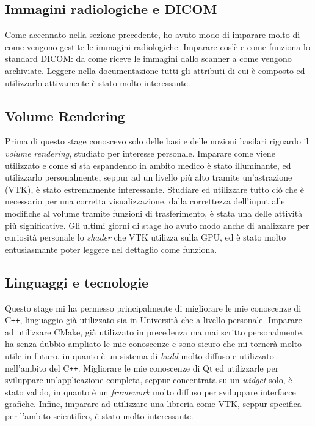\subsection{Immagini radiologiche e DICOM}
Come accennato nella sezione precedente, ho avuto modo di imparare molto di come vengono gestite le immagini radiologiche. Imparare cos'è e come funziona lo standard DICOM: da come riceve le immagini dallo scanner a come vengono archiviate. Leggere nella documentazione tutti gli attributi di cui è composto ed utilizzarlo attivamente è stato molto interessante.

\subsection{Volume Rendering}
Prima di questo stage conoscevo solo delle basi e delle nozioni basilari riguardo il \emph{volume rendering}, studiato per interesse personale. Imparare come viene utilizzato e come si sta espandendo in ambito medico è stato illuminante, ed utilizzarlo personalmente, seppur ad un livello più alto tramite un'astrazione (VTK), è stato estremamente interessante. Studiare ed utilizzare tutto ciò che è necessario per una corretta visualizzazione, dalla correttezza dell'input alle modifiche al volume tramite funzioni di trasferimento, è stata una delle attività più significative. Gli ultimi giorni di stage ho avuto modo anche di analizzare per curiosità personale lo \emph{shader} che VTK utilizza sulla GPU, ed è stato molto entusiasmante poter leggere nel dettaglio come funziona.

\subsection{Linguaggi e tecnologie}
Questo stage mi ha permesso principalmente di migliorare le mie conoscenze di C\texttt{++}, linguaggio già utilizzato sia in Università che a livello personale. Imparare ad utilizzare CMake, già utilizzato in precedenza ma mai scritto personalmente, ha senza dubbio ampliato le mie conoscenze e sono sicuro che mi tornerà molto utile in futuro, in quanto è un sistema di \emph{build} molto diffuso e utilizzato nell'ambito del C\texttt{++}. Migliorare le mie conoscenze di Qt ed utilizzarle per sviluppare un'applicazione completa, seppur concentrata su un \emph{widget} solo, è stato valido, in quanto è un \emph{framework} molto diffuso per sviluppare interfacce grafiche. Infine, imparare ad utilizzare una libreria come VTK, seppur specifica per l'ambito scientifico, è stato molto interessante. 

